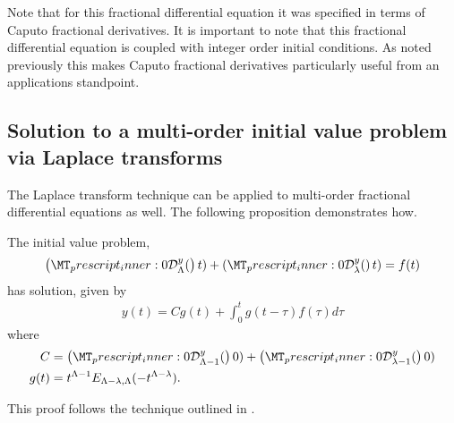 Note that for this fractional differential equation it was specified in terms of Caputo fractional derivatives. It is important to note that this fractional differential equation is coupled with integer order initial conditions. As noted previously this makes Caputo fractional derivatives particularly useful from an applications standpoint.

\subsection{Solution to a multi-order initial value problem via Laplace transforms}
The Laplace transform technique can be applied to multi-order fractional differential equations as well. The following proposition demonstrates how.
\begin{mdframed}[innertopmargin=10pt]
\begin{lemma}
	The initial value problem,
	\begin{align}
		\rld{0}{\Lambda}{y}(t) + \rld{0}{\lambda}{y}(t) = f(t)
	\end{align}
	has solution, given by
	\begin{align}
		y(t) = C g(t) + \int_0^t g(t-\tau)f(\tau) d\tau
	\end{align}
	where
	\begin{align}
		C &= \rld{0}{\Lambda-1}{y}(0) + \rld{0}{\lambda-1}{y}(0) \\
		g(t) &= t^{\Lambda - 1} E_{\Lambda - \lambda, \Lambda}(-t^{\Lambda - \lambda}).
	\end{align}
\end{lemma}
\end{mdframed}
This proof follows the technique outlined in \cite{Podlubny1999}.
